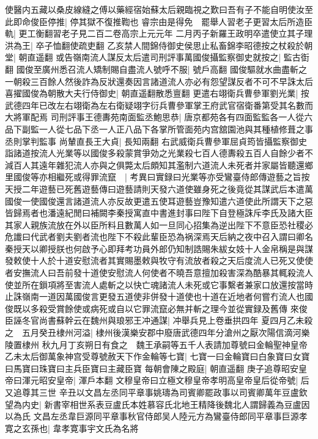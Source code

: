 使醫内五藏以桑皮線縫之傅以藥經宿始蘇太后親臨視之歎曰吾有子不能自明使汝至此即命俊臣停推|{
	停其獄不復推鞫也}
睿宗由是得免　罷舉人習老子更習太后所造臣軌|{
	更工衡翻習老子見二百二卷高宗上元元年}
二月丙子新羅王政明卒遣使立其子理洪為王|{
	卒子恤翻使疏吏翻}
乙亥禁人間錦侍御史侯思止私畜錦李昭德按之杖殺於朝堂|{
	朝直遥翻}
或告嶺南流人謀反太后遣司刑評事萬國俊攝監察御史就按之|{
	監古衘翻}
國俊至廣州悉召流人矯制賜自盡流人號呼不服|{
	號戶高翻}
國俊驅就水曲盡斬之一朝殺三百餘人然後詐為反狀還奏因言諸道流人亦必有怨望謀反者不可不早誅太后喜擢國俊為朝散大夫行侍御史|{
	朝直遥翻散悉亶翻}
更遣右翊衛兵曹參軍劉光業|{
	按武德四年已改左右翊衛為左右衛疑翊字衍兵曹參軍掌王府武官宿衛番第受其名數而大將軍配焉}
司刑評事王德夀苑南面監丞鮑思恭|{
	唐京都苑各有四面監監各一人從六品下副監一人從七品下丞一人正八品下各掌所管面苑内宫舘園池與其種植修葺之事丞則掌判監事}
尚輦直長王大貞|{
	長知兩翻}
右武威衛兵曹參軍屈貞筠皆攝監察御史詣諸道按流人光業等以國俊多殺蒙賞爭効之光業殺七百人德夀殺五百人自餘少者不減百人其遠年雜犯流人亦與之俱斃太后頗知其濫制六道流人未死者并家屬皆聽還鄉里國俊等亦相繼死或得罪流竄　|{
	考異曰實録曰光業等亦受鸞臺侍郎傳遊藝之旨按天授二年遊藝已死舊遊藝傳曰遊藝請則天發六道使雖身死之後竟從其謀武后本遣萬國俊一使國俊還言諸道流人亦反故更遣五使耳遊藝豈豫知遣六道使此所謂天下之惡皆歸焉者也潘遠紀閒曰補闕李秦授寓直中書進封事曰陛下自登極誅斥李氏及諸大臣其家人親族流放在外以臣所料且數萬人如一旦同心招集為逆出陛下不意臣恐社稷必危䜟曰代武者劉夫劉者流也陛下不殺此輩臣恐為祸深焉天后納之夜中召入謂曰卿名秦授天以卿授朕也何啟予心即拜考功員外郎仍知制誥賜朱紱女妓十人金帛稱是與謀發敕使十人於十道安慰流者其實賜墨敕與牧守有流放者殺之天后度流人已死又使使者安撫流人曰吾前發十道使安慰流人何使者不曉吾意擅加殺害深為酷暴其輒殺流人使並所在鎻項將至害流人處斬之以快亡魂諸流人未死或它事繫者兼家口放還按當時止誅嶺南一道因萬國俊言更發五道使非併發十道使也十道在近地者何嘗冇流人也國俊既以多殺受賞餘使或病死或自以它罪流竄必無并斬之理今並從實録及舊傳}
來俊臣誣冬官尚書蘇幹云在魏州與琅邪王冲通謀|{
	冲舉兵見上卷垂拱四年}
夏四月乙未殺之　五月癸丑棣州河溢|{
	棣州後漢樂安郡中廢唐武德四年分滄州之厭次陽信滴河樂陵置棣州}
秋九月丁亥朔日有食之　魏王承嗣等五千人表請加尊號曰金輪聖神皇帝　乙未太后御萬象神宫受尊號赦天下作金輪等七寶|{
	七寶一曰金輪寶曰白象寶曰女寶曰馬寶曰珠寶曰主兵臣寶曰主藏臣寶}
每朝會陳之殿庭|{
	朝直遥翻}
庚子追尊昭安皇帝曰渾元昭安皇帝|{
	渾戶本翻}
文穆皇帝曰立極文穆皇帝孝明高皇帝皇后從帝號|{
	后又追尊其三世}
辛丑以文昌左丞同平章事姚璹為司賓卿罷政事以司賓卿萬年豆盧欽望為内史|{
	新書宰相世系表豆盧氏本姓慕容氏北地王精降後魏北人謂歸義為豆盧因以為氏}
文昌左丞韋巨源同平章事秋官侍郎吴人陸元方為鸞臺侍郎同平章事巨源孝寛之玄孫也|{
	韋孝寛事宇文氏為名將}



